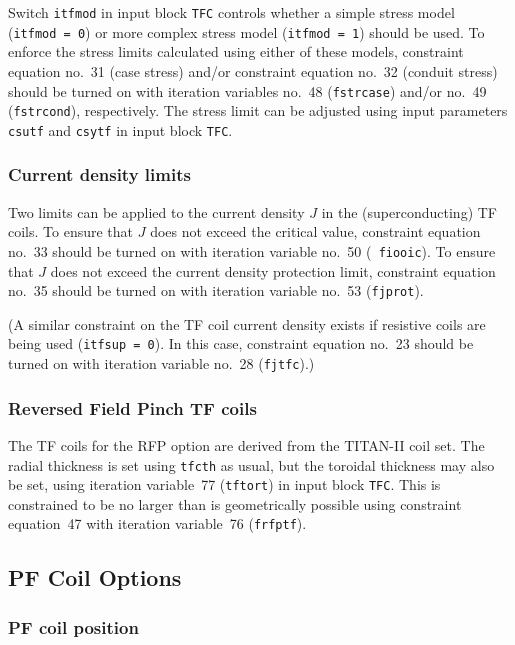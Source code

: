 \documentclass[11pt,a4paper]{report}
\begin{document}
Switch {\tt itfmod} in input block {\tt TFC} controls whether a simple stress
model ({\tt itfmod~=~0}) or more complex stress model ({\tt itfmod = 1})
should be used. To enforce the stress limits calculated using either of these
models, constraint equation no.\ 31 (case stress) and/or constraint equation
no.\ 32 (conduit stress) should be turned on with iteration variables no.\ 48
({\tt fstrcase}) and/or no.\ 49 ({\tt fstrcond}), respectively. The stress
limit can be adjusted using input parameters {\tt csutf} and {\tt csytf} in
input block {\tt TFC}.

\subsubsection{Current density limits}


Two limits can be applied to the current density $J$ in the (superconducting)
TF coils. To ensure that $J$ does not exceed the critical value, constraint
equation no.\ 33 should be turned on with iteration variable no.\ 50 ({\tt
fiooic}). To ensure that $J$ does not exceed the current density protection
limit, constraint equation no.\ 35 should be turned on with iteration variable
no.\ 53 ({\tt fjprot}).
\setlength{\parskip}{5mm}

(A similar constraint on the TF coil current density exists if resistive coils
are being used ({\tt itfsup = 0}). In this case, constraint equation no.\ 23
should be turned on with iteration variable no.\ 28 ({\tt fjtfc}).)
\setlength{\parskip}{0mm}

\subsubsection{Reversed Field Pinch TF coils}

The TF coils for the RFP option are derived from the TITAN-II coil set. The
radial thickness is set using \texttt{tfcth} as usual, but the toroidal
thickness may also be set, using iteration variable~77 (\texttt{tftort}) in
input block \texttt{TFC}. This is constrained to be no larger than is
geometrically possible using constraint equation~47 with iteration variable~76
(\texttt{frfptf}).

\subsection{PF Coil Options}

\subsubsection{PF coil position}
\end{document}
